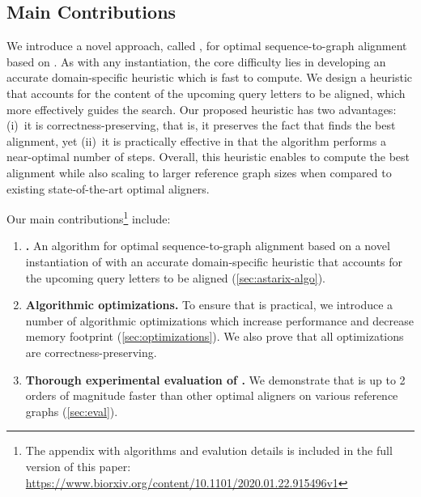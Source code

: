 \subsection{Main Contributions}
We introduce a novel approach, called \astarix, for optimal sequence-to-graph alignment based on \A. As with any \A instantiation, the core difficulty lies in developing an accurate domain-specific heuristic which is fast to compute.
We design a heuristic that accounts for the content of the upcoming query letters to be aligned, which more effectively guides the search.
Our proposed heuristic has two advantages: (i)~it is correctness-preserving, that is, it preserves the fact that \astarix finds the best alignment, yet (ii)~it is practically effective in that the algorithm performs a near-optimal number of steps. Overall, this heuristic enables \astarix to compute the best alignment while also scaling to larger reference graph sizes when compared to existing state-of-the-art optimal aligners.

\begin{samepage}
Our main contributions\footnote{The appendix with algorithms and evalution
details is included in the full version of this paper:
\url{https://www.biorxiv.org/content/10.1101/2020.01.22.915496v1}} include:
	
\begin{enumerate}
	\item \textbf{\astarix.} An algorithm for optimal sequence-to-graph
	alignment based on a novel instantiation of \A with an accurate
	domain-specific heuristic that accounts for the upcoming query letters to be
	aligned (\cref{sec:astarix-algo}).
	\item \textbf{Algorithmic optimizations.}
	To ensure that \astarix is practical, we introduce a number of algorithmic
	optimizations which increase performance and decrease memory footprint
	(\cref{sec:optimizations}). We also prove that all optimizations are
	correctness-preserving.
	\item \textbf{Thorough experimental evaluation of \astarix.}
	We demonstrate that \astarix is up to 2 orders of magnitude faster than
	other optimal aligners on various reference graphs (\cref{sec:eval}).
\end{enumerate}
\end{samepage}
